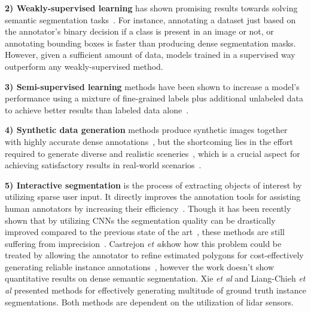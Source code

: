 \documentclass{bmvc2k}
\def\etal{\emph{et al}\bmvaOneDot}
\begin{document}
{\bf2) Weakly-supervised learning} has shown promising results towards solving semantic  segmentation tasks~\cite{DBLP:conf/iccv/PapandreouCMY15, DBLP:conf/cvpr/ZhangZWX15, DBLP:conf/eccv/KolesnikovL16, DBLP:conf/eccv/ShimodaY16, DBLP:conf/eccv/SalehASPGA16, DBLP:conf/iccv/SalehASPA17, DBLP:journals/pami/LuFXHWG17, DBLP:conf/cvpr/HongYKLH17, DBLP:conf/cvpr/KhorevaBH0S17,DBLP:conf/cvpr/OhBKAFS17}. For instance, annotating a dataset just based on the annotator's binary decision if a class is present in an image or not, or annotating bounding boxes is faster than producing dense segmentation masks. However, given a sufficient amount of data, models trained in a supervised way outperform any weakly-supervised method.

{\bf3) Semi-supervised learning} methods have been shown to increase a model's performance using a mixture of fine-grained labels plus additional unlabeled data to achieve better results than labeled data alone~\cite{DBLP:conf/iccv/PapandreouCMY15,8237868,DBLP:journals/corr/abs-1802-07934}.

{\bf4) Synthetic data generation} methods produce synthetic images together with highly accurate dense annotations~\cite{DBLP:conf/eccv/RichterVRK16, DBLP:conf/bmvc/ShafaeiLS16, DBLP:journals/corr/abs-1708-01566}, but the shortcoming lies in the effort required to generate diverse and realistic sceneries~\cite{DBLP:journals/corr/abs-1708-01566}, which is a crucial aspect for achieving satisfactory results in real-world scenarios~\cite{DBLP:conf/eccv/Movshovitz-Attias16, DBLP:conf/cvpr/ZhangSYSLJF17}. 

{\bf5) Interactive segmentation} is the process of extracting objects of interest by utilizing sparse user input. It directly improves the annotation tools for assisting human annotators by increasing their efficiency~\cite{DBLP:conf/bmvc/FathiBRR11, DBLP:conf/cvpr/LuBSW16, DBLP:conf/cvpr/FengPCC16}. Though it has been recently shown that by utilizing CNNs the segmentation quality can be drastically improved compared to the previous state of the art~\cite{DBLP:conf/cvpr/XuPCYH16}, these methods are still suffering from imprecision~\cite{DBLP:conf/cvpr/CastrejonKUF17}. Castrejon \etal show how this problem could be treated by allowing the annotator to refine estimated polygons for cost-effectively generating reliable instance annotations~\cite{DBLP:conf/cvpr/CastrejonKUF17}, however the work doesn't show quantitative results on dense semantic segmentation. Xie \etal\cite{DBLP:conf/cvpr/XieKSG16} and Liang-Chieh \etal\cite{DBLP:conf/cvpr/ChenFU14} presented methods for effectively generating multitude of ground truth instance segmentations. Both methods are dependent on the utilization of lidar sensors.
\end{document}
